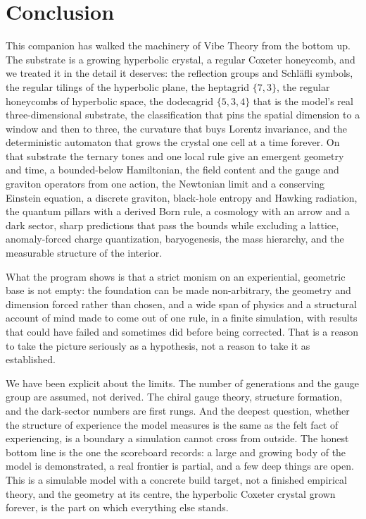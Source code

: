\section{Conclusion}
\label{sec:conclusion}

This companion has walked the machinery of Vibe Theory from the bottom up. The substrate is a
growing hyperbolic crystal, a regular Coxeter honeycomb, and we treated it in the detail it
deserves: the reflection groups and Schl\"afli symbols, the regular tilings of the hyperbolic
plane, the heptagrid $\{7,3\}$, the regular honeycombs of hyperbolic space, the dodecagrid
$\{5,3,4\}$ that is the model's real three-dimensional substrate, the classification that pins the
spatial dimension to a window and then to three, the curvature that buys Lorentz invariance, and
the deterministic automaton that grows the crystal one cell at a time forever. On that substrate
the ternary tones and one local rule give an emergent geometry and time, a bounded-below
Hamiltonian, the field content and the gauge and graviton operators from one action, the Newtonian
limit and a conserving Einstein equation, a discrete graviton, black-hole entropy and Hawking
radiation, the quantum pillars with a derived Born rule, a cosmology with an arrow and a dark
sector, sharp predictions that pass the bounds while excluding a lattice, anomaly-forced charge
quantization, baryogenesis, the mass hierarchy, and the measurable structure of the interior.

What the program shows is that a strict monism on an experiential, geometric base is not empty: the
foundation can be made non-arbitrary, the geometry and dimension forced rather than chosen, and a
wide span of physics and a structural account of mind made to come out of one rule, in a finite
simulation, with results that could have failed and sometimes did before being corrected. That is a
reason to take the picture seriously as a hypothesis, not a reason to take it as established.

We have been explicit about the limits. The number of generations and the gauge group are assumed,
not derived. The chiral gauge theory, structure formation, and the dark-sector numbers are first
rungs. And the deepest question, whether the structure of experience the model measures is the same
as the felt fact of experiencing, is a boundary a simulation cannot cross from outside. The honest
bottom line is the one the scoreboard records: a large and growing body of the model is
demonstrated, a real frontier is partial, and a few deep things are open. This is a simulable model
with a concrete build target, not a finished empirical theory, and the geometry at its centre, the
hyperbolic Coxeter crystal grown forever, is the part on which everything else stands.
